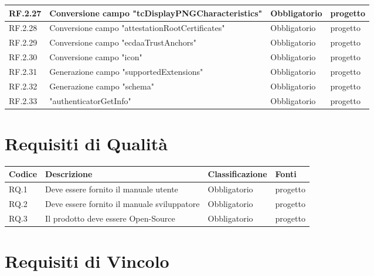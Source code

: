 \begin{center}
\begin{longtable}{|L{2cm}|C{5,5cm}|C{3cm}|C{2cm}|}
    RF.2.27 & Conversione campo "tcDisplayPNGCharacteristics" & Obbligatorio & progetto \\ \hline
    RF.2.28 & Conversione campo "attestationRootCertificates" & Obbligatorio & progetto \\ \hline
    RF.2.29 & Conversione campo "ecdaaTrustAnchors" & Obbligatorio & progetto \\ \hline
    RF.2.30 & Conversione campo "icon" & Obbligatorio & progetto \\ \hline
    RF.2.31 & Generazione campo "supportedExtensions" & Obbligatorio & progetto \\ \hline
    RF.2.32 & Generazione campo "schema" & Obbligatorio & progetto \\ \hline
    RF.2.33 & "authenticatorGetInfo" & Obbligatorio & progetto \\ \hline
  \end{longtable}
\end{center}


\section{Requisiti di Qualità}

\begin{center}
  \centering
  \begin{longtable}{|L{2cm}|C{5,5cm}|C{3cm}|C{2cm}|}
    \hline
    \textcolor[HTML]{FFFFFF}{\textbf{Codice}} & \textcolor[HTML]{FFFFFF}{\textbf{Descrizione}} & \textcolor[HTML]{FFFFFF}{\textbf{Classificazione}} & \textcolor[HTML]{FFFFFF}{\textbf{Fonti}}
    \\ \hline
    RQ.1 & Deve essere fornito il manuale utente & Obbligatorio & progetto \\ \hline
    RQ.2 & Deve essere fornito il manuale sviluppatore & Obbligatorio & progetto \\ \hline
    RQ.3 & Il prodotto deve essere Open-Source & Obbligatorio & progetto \\ \hline
  \end{longtable}
\end{center}

\section{Requisiti di Vincolo}

